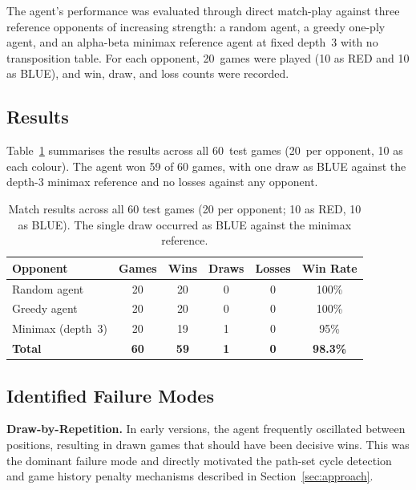 \documentclass[10.5pt,a4paper]{article}
\begin{document}
The agent's performance was evaluated through direct match-play against three reference opponents of increasing strength: a random agent, a greedy one-ply agent, and an alpha-beta minimax reference agent at fixed depth~3 with no transposition table. For each opponent, 20~games were played (10 as RED and 10 as BLUE), and win, draw, and loss counts were recorded.

\subsection{Results}

Table~\ref{tab:results} summarises the results across all 60~test games (20~per opponent, 10 as each colour). The agent won 59 of 60 games, with one draw as BLUE against the depth-3 minimax reference and no losses against any opponent.

\begin{table}[h]
\centering
\small
\begin{tabular}{lccccc}
\toprule
\textbf{Opponent} & \textbf{Games} & \textbf{Wins} & \textbf{Draws} & \textbf{Losses} & \textbf{Win Rate} \\
\midrule
Random agent       & 20 & 20 & 0 & 0 & 100\% \\
Greedy agent       & 20 & 20 & 0 & 0 & 100\% \\
Minimax (depth~3)  & 20 & 19 & 1 & 0 & 95\%  \\
\midrule
\textbf{Total}     & \textbf{60} & \textbf{59} & \textbf{1} & \textbf{0} & \textbf{98.3\%} \\
\bottomrule
\end{tabular}
\caption{Match results across all 60 test games (20 per opponent; 10 as RED, 10 as BLUE). The single draw occurred as BLUE against the minimax reference.}
\label{tab:results}
\end{table}

\subsection{Identified Failure Modes}

\textbf{Draw-by-Repetition.}
In early versions, the agent frequently oscillated between positions, resulting in drawn games that should have been decisive wins. This was the dominant failure mode and directly motivated the path-set cycle detection and game history penalty mechanisms described in Section~\ref{sec:approach}.
\end{document}
